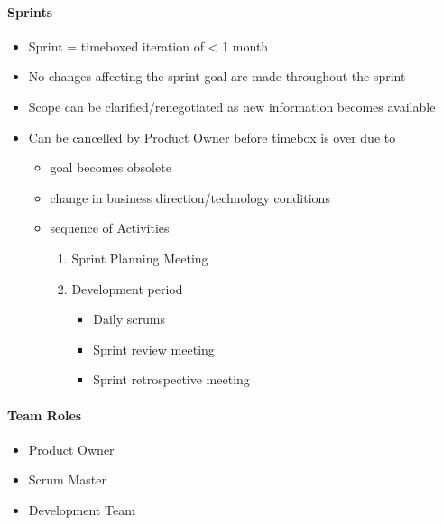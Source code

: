 \documentclass[letterpaper,10pt,english]{jupyterBook}
\begin{document}
\paragraph{Sprints}
\label{\detokenize{APM/agile:sprints}}\begin{itemize}
\item {} 
\sphinxAtStartPar
Sprint = timeboxed iteration of < 1 month

\item {} 
\sphinxAtStartPar
No changes affecting the sprint goal are made throughout the sprint

\item {} 
\sphinxAtStartPar
Scope can be clarified/renegotiated as new information becomes available

\item {} 
\sphinxAtStartPar
Can be cancelled by Product Owner before timebox is over due to
\begin{itemize}
\item {} 
\sphinxAtStartPar
goal becomes obsolete

\item {} 
\sphinxAtStartPar
change in business direction/technology conditions

\item {} 
\sphinxAtStartPar
sequence of Activities
\begin{enumerate}
%
\item {} 
\sphinxAtStartPar
Sprint Planning Meeting

\item {} 
\sphinxAtStartPar
Development period
\begin{itemize}
\item {} 
\sphinxAtStartPar
Daily scrums

\item {} 
\sphinxAtStartPar
Sprint review meeting

\item {} 
\sphinxAtStartPar
Sprint retrospective meeting

\end{itemize}

\end{enumerate}

\end{itemize}

\end{itemize}


\paragraph{Team Roles}
\label{\detokenize{APM/agile:team-roles}}\begin{itemize}
\item {} 
\sphinxAtStartPar
Product Owner

\item {} 
\sphinxAtStartPar
Scrum Master

\item {} 
\sphinxAtStartPar
Development Team

\end{itemize}
\end{document}
